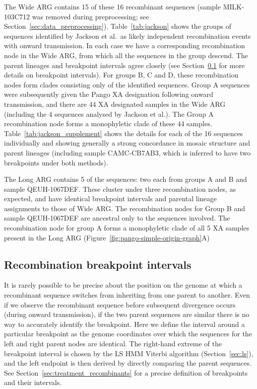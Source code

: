 \documentclass{article}
\begin{document}
The Wide ARG contains 15 of these 16 recombinant sequences
(sample MILK-103C712 was removed during preprocessing; see
Section~\ref{sec:data_preprocessing}).
Table~\ref{tab:jackson} shows the groups of sequences identified by Jackson
et al.\ as likely independent recombination events with onward transmission.
In each case we have a corresponding recombination node in the Wide ARG,
from which all the sequences in the group descend. The parent lineages
and breakpoint intervals agree closely (see
Section~\ref{sec:breakpoint_intervals} for more details on breakpoint
intervals).
For groups B, C and D,
these recombination nodes form clades consisting only of the identified
sequences.
Group A sequences were subsequently given the Pango XA designation
following onward transmission,
and there are 44 XA designated samples in the Wide ARG (including the
4 sequences analysed by Jackson et al.). The Group A recombination
node forms a monophyletic clade of these 44 samples.
Table~\ref{tab:jackson_supplement} shows the details for each of the
16 sequences individually and showing generally a strong concordance
in mosaic structure and parent lineages
(including sample CAMC-CB7AB3, which is inferred to have two breakpoints under both
methods).

The Long ARG contains 5 of the sequences: two each from groups A and B
and sample QEUH-1067DEF. These cluster under three recombination nodes, as expected,
and have identical breakpoint intervals and parental lineage assignments
to those of Wide ARG.
The recombination nodes for Group B and sample QEUH-1067DEF are ancestral only
to the sequences involved.
The recombination node for group A forms a monophyletic clade of all
5 XA samples present in the Long ARG
(Figure~\ref{fig:pango-simple-origin-graph}A)

\subsection{Recombination breakpoint intervals}
\label{sec:breakpoint_intervals}
It is rarely possible to be precise about the position on the genome at which
a recombinant sequence switches from inheriting from one parent to another.
Even if we observe the recombinant sequence before subsequent
divergence occurs (during onward transmission), if the two parent sequences
are similar there is no way to
accurately identify the breakpoint.
Here we define the
interval around a particular breakpoint as the genome coordinates over which the
sequences for the left and right parent nodes are identical. The right-hand
extreme of the breakpoint interval is chosen by the LS HMM Viterbi algorithm
(Section~\ref{sec:ls}), and the left endpoint is then derived by directly
comparing the parent sequences. See Section~\ref{sec:treatment_recombinants} for
a precise definition of breakpoints and their intervals.
\end{document}

